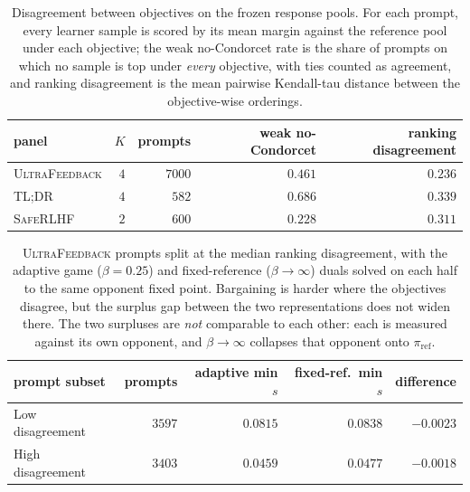 \documentclass{article}
\theoremstyle{remark}
\theoremstyle{plain}
\newcommand{\piref}{\pi_{\mathrm{ref}}}
\begin{document}
\begin{table}[t]
\centering\footnotesize
\setlength{\tabcolsep}{3.0pt}
\caption{Disagreement between objectives on the frozen response pools. For each prompt, every learner sample is scored by its mean margin against the reference pool under each objective; the weak no-Condorcet rate is the share of prompts on which no sample is top under \emph{every} objective, with ties counted as agreement, and ranking disagreement is the mean pairwise Kendall-tau distance between the objective-wise orderings.}
\label{tab:objective-disagreement}
\begin{tabular}{lrrrr}
\toprule
panel & $K$ & prompts & weak no-Condorcet & ranking disagreement\\
\midrule
\textsc{UltraFeedback} & $4$ & $7000$ & $0.461$ & $0.236$\\
\textsc{TL;DR} & $4$ & $582$ & $0.686$ & $0.339$\\
\textsc{SafeRLHF} & $2$ & $600$ & $0.228$ & $0.311$\\
\bottomrule
\end{tabular}
\end{table}

\begin{table}[t]
\centering\footnotesize
\setlength{\tabcolsep}{3.0pt}
\caption{\textsc{UltraFeedback} prompts split at the median ranking disagreement, with the adaptive game ($\beta{=}0.25$) and fixed-reference ($\beta\to\infty$) duals solved on each half to the same opponent fixed point. Bargaining is harder where the objectives disagree, but the surplus gap between the two representations does not widen there. The two surpluses are \emph{not} comparable to each other: each is measured against its own opponent, and $\beta\to\infty$ collapses that opponent onto $\piref$.}
\label{tab:cycle-conditioned}
\begin{tabular}{lrrrr}
\toprule
prompt subset & prompts & adaptive min $s$ & fixed-ref.\ min $s$ & difference\\
\midrule
Low disagreement & $3597$ & $0.0815$ & $0.0838$ & $-0.0023$\\
High disagreement & $3403$ & $0.0459$ & $0.0477$ & $-0.0018$\\
\bottomrule
\end{tabular}
\end{table}
\end{document}
